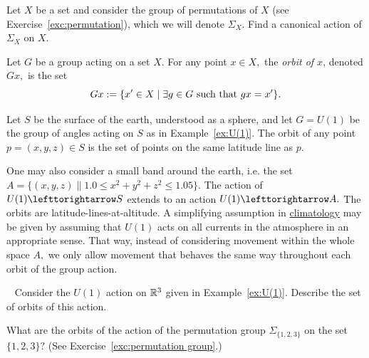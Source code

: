 \documentclass[../main/CT4S-EN-RU]{subfiles}
\begin{document}
\begin{exampleRUS}\label{ex:U(1)}
\end{exampleRUS}

\begin{exerciseENG}\label{exc:permutation group}
Let $X$ be a set and consider the group of permutations of $X$ (see Exercise~\ref{exc:permutation}), which we will denote $\Sigma_X$. Find a canonical action of $\Sigma_X$ on $X.$
\end{exerciseENG}

\begin{exerciseRUS}\label{exc:permutation group}
\end{exerciseRUS}

\begin{definitionENG}
Let $G$ be a group acting on a set $X.$ For any point $x\in X,$ the {\em orbit of $x$}, denoted $Gx,$ is the set 
$$Gx:=\{x'\in X{\;|\;}\exists g\in G \textnormal{ such that }gx=x'\}.$$
\end{definitionENG}

\begin{definitionRUS}
\end{definitionRUS}

\begin{applicationENG}
Let $S$ be the surface of the earth, understood as a sphere, and let $G=U(1)$ be the group of angles acting on $S$ as in Example~\ref{ex:U(1)}. The orbit of any point $p=(x,y,z)\in S$ is the set of points on the same latitude line as $p.$

One may also consider a small band around the earth, i.e. the set $A=\{(x,y,z)\|1.0\leq x^2+y^2+z^2\leq 1.05\}.$ The action of $U(1)\acts S$ extends to an action $U(1)\acts A.$ The orbits are latitude-lines-at-altitude. A simplifying assumption in \href{http://en.wikipedia.org/wiki/Climatology}{\text climatology} may be given by assuming that $U(1)$ acts on all currents in the atmosphere in an appropriate sense. That way, instead of considering movement within the whole space $A,$ we only allow movement that behaves the same way throughout each orbit of the group action.
\end{applicationENG}

\begin{applicationRUS}
\end{applicationRUS}

\begin{exerciseENG}~
\sexc Consider the $U(1)$ action on ${\mathbb R}^3$ given in Example~\ref{ex:U(1)}. Describe the set of orbits of this action.
\item What are the orbits of the action of the permutation group $\Sigma_{\{1,2,3\}}$ on the set $\{1,2,3\}?$ (See Exercise~\ref{exc:permutation group}.)
\endsexc
\end{exerciseENG}
\end{document}
